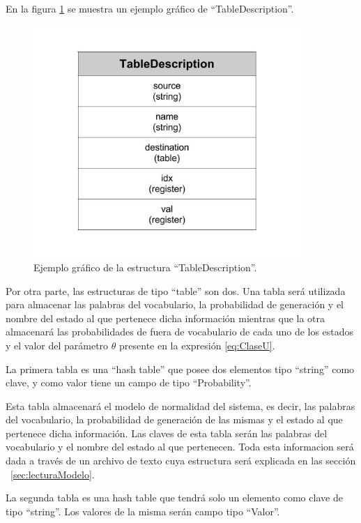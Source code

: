 En la figura \ref{fig:TableDescription} se muestra un ejemplo gráfico de ``TableDescription''.

\begin{figure}[!htb]
\begin{center}
\includegraphics[width=4in]{./img/TableDescription.jpg}
\caption{Ejemplo gráfico de la estructura ``TableDescription''.}
\label{fig:TableDescription}
\end{center}
\end{figure}	

Por otra parte, las estructuras de tipo ``table'' son dos. Una tabla será utilizada para almacenar las palabras del vocabulario, la probabilidad de generación y el nombre del estado al que pertenece dicha información mientras que la otra almacenará las probabilidades de fuera de vocabulario de cada uno de los estados y el valor del parámetro $\theta$ presente en la expresión \ref{eq:ClaseU}.

La primera tabla es una ``hash table'' que posee dos elementos tipo ``string'' como clave, y como valor tiene un campo de tipo ``Probability''.

Esta tabla almacenará el modelo de normalidad del sistema, es decir, las palabras del vocabulario, la probabilidad de generación de las mismas y el estado al que pertenece dicha información. Las claves de esta tabla serán las palabras del vocabulario y el nombre del estado al que pertenecen. Toda esta informacion será dada a través de un archivo de texto cuya estructura será explicada en las sección ~\ref{sec:lecturaModelo}.

La segunda tabla es una hash table que tendrá solo un elemento como clave de tipo ``string''. Los valores de la misma serán campo tipo ``Valor''. 


